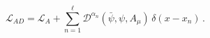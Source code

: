\begin{equation}
\mathcal{L}_{AD}=\mathcal{L}_{A}+\sum_{n=1}^{\ell }\mathcal{D}^{\alpha _{n}}(%
\bar{\psi},\psi ,A_{\mu })\,\delta (x-x_{n})\,.  \label{Lda}
\end{equation}

